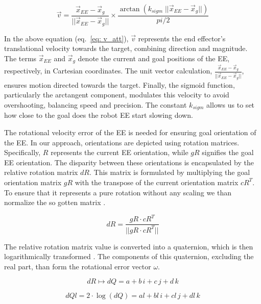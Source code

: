 \documentclass[letterpaper, 10 pt, conference]{ieeeconf}  %
\begin{document}
\begin{equation} 
	\vec{v} = \frac{\vec{x}_{EE} - \vec{x}_g}{||\vec{x}_{EE} - \vec{x}_g||} \times \frac{\arctan(k_{sigm} \; ||\vec{x}_{EE} - \vec{x}_g||) }{pi/2}
	\label{eq: v_att}
\end{equation}

In the above equation (eq.~\ref{eq: v_att}), $\vec{v}$  represents the end effector's translational velocity towards the target, combining direction and magnitude. The terms $\vec{x}_{EE}$ and $\vec{x}_g$ denote the current and goal positions of the EE, respectively, in Cartesian coordinates. The unit vector calculation, $\frac{\vec{x}_{EE}-\vec{x}_g}{||\vec{x}_{EE}-\vec{x}_g||}$, ensures motion directed towards the target. Finally, the sigmoid function, particularly the arctangent component, modulates this velocity to avoid overshooting, balancing speed and precision. The constant $k_{sigm}$ allows us to set how close to the goal does the robot EE start slowing down.

The rotational velocity error of the EE is needed for ensuring goal orientation of the EE. In our approach, orientations are depicted using rotation matrices. Specifically, \( R \) represents the current EE orientation, while \( gR \) signifies the goal EE orientation. The disparity between these orientations is encapsulated by the relative rotation matrix \( dR \). This matrix is formulated by multiplying the goal orientation matrix \( gR \) with the transpose of the current orientation matrix \( cR^{T} \). To ensure that it represents a pure rotation without any scaling we than normalize the so gotten matrix .

\begin{equation}
	dR = \frac{gR \cdot cR^{T}}{||gR \cdot cR^{T}||}
	\label{eq: rot_diff_mat}
\end{equation}

The relative rotation matrix value is converted into a quaternion, which is then logarithmically transformed . The components of this quaternion, excluding the real part, than form the rotational error vector \( \omega \).

\begin{equation}
	dR \mapsto dQ = a + b \, i + c \, j + d \, k
	\label{eq: quat_mapsto}
\end{equation}

\begin{equation}
	dQl = 2 \cdot \log(dQ) = al + bl \, i + cl \, j + dl \, k
	\label{eq:quat_log}
\end{equation}
\end{document}
